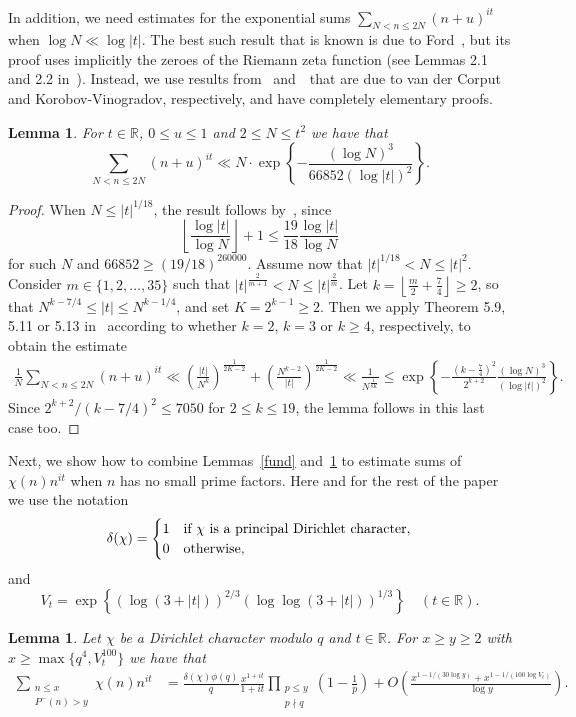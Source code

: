 \documentclass[12pt]{amsart}
\newtheorem{lemma}[theorem]{Lemma}
\theoremstyle{remark}
\newcommand {\SR} {{\mathbb R}}
\newcommand{\bsp}{\begin{split}}
\newcommand{\bes}{\begin{equation*}}
\newcommand{\ees}{\end{equation*}}
\numberwithin{equation}{section}
\begin{document}
In addition, we need estimates for the exponential sums $\sum_{N<n\le2N}(n+u)^{it}$ when $\log N\ll\log|t|$. The best such result that is known is due to Ford~\cite[Theorem 2]{Fo}, but its proof uses implicitly the zeroes of the Riemann zeta function (see Lemmas 2.1 and 2.2 in~\cite{Fo}). Instead, we use results from~\cite[Chapter 5]{titch} and~\cite[Chapter 2]{walfisz}\ that are due to van der Corput and Korobov-Vinogradov, respectively, and have completely elementary proofs.

\begin{lemma}\label{nit} For $t\in\SR$, $0\le u\le1$ and $2\le N\le t^2$ we have that 
$$
\sum_{N<n\le2N}(n+u)^{it}\ll N\cdot\exp\left\{-\frac{(\log N)^3}{66852(\log|t|)^2}\right\}.
$$
\end{lemma}

\begin{proof} When $N\le|t|^{1/18}$, the result follows by~\cite[Satz 2, p. 57]{walfisz}, since 
$$
\left\lfloor\frac{\log|t|}{\log N}\right\rfloor+1\le\frac{19}{18}\frac{\log|t|}{\log N}
$$ 
for such $N$ and $66852\ge(19/18)^260000$. Assume now that $|t|^{1/18}<N\le|t|^2$. Consider $m\in\{1,2,\dots,35\}$ such that $|t|^{\frac2{m+1}}<N\le |t|^{\frac2m}$. Let $k=\left\lfloor \frac m2+\frac74\right\rfloor\ge2$, so that $N^{k-7/4}\le|t|\le N^{k-1/4}$, and set $K=2^{k-1}\ge2$. Then we apply Theorem 5.9, 5.11 or 5.13 in~\cite[Section 5.9, p. 104-107]{titch} according to whether $k=2$, $k=3$ or $k\ge4$, respectively, to obtain the estimate
\bes\bsp
\frac1N\sum_{N<n\le2N}(n+u)^{it}\ll\left(\frac{|t|}{N^k}\right)^{\frac1{2K-2}}+\left(\frac{N^{k-2}}{|t|}\right)^{\frac1{2K-2}}\ll \frac1{N^{\frac1{8K}}}\le\exp\left\{-\frac{\left(k-\frac74\right)^2}{2^{k+2}}\frac{(\log N)^3}{(\log|t|)^2}\right\}.
\end{split}\ees
Since $2^{k+2}/(k-7/4)^2\le7050$ for $2\le k\le19$, the lemma follows in this last case too.
\end{proof}

Next, we show how to combine Lemmas~\ref{fund} and~\ref{nit} to estimate sums of $\chi(n)n^{it}$ when $n$ has no small prime factors. Here and for the rest of the paper we use the notation 
$$
\delta(\chi)
	=\begin{cases}
		1&\text{if}\ \chi\ \text{is a principal Dirichlet character},\cr 
		0&\text{otherwise},
	\end{cases}
$$
and 
$$
V_t=\exp\left\{(\log(3+|t|))^{2/3}(\log\log(3+|t|))^{1/3}\right\}\quad(t\in\SR).
$$

\begin{lemma}\label{chinit} Let $\chi$ be a Dirichlet character modulo $q$ and $t\in\SR$. For $x\ge y\ge 2$ with $x\ge \max\{q^4,V_t^{100}\}$ we have that 
\bes\bsp\sum_{\substack{n\le x\\P^-(n)>y}}\chi(n)n^{it}
	&=\frac{\delta(\chi)\phi(q)}q\frac{x^{1+it}}{1+it}\prod_{\substack{p\le y\\p\nmid q}}\left(1-\frac1p\right)	
	+O\left(\frac{x^{1-1/(30\log y)} + x^{1-1/(100\log V_t)} }{\log y}\right).
\end{split}\ees
\end{lemma}
\end{document}
